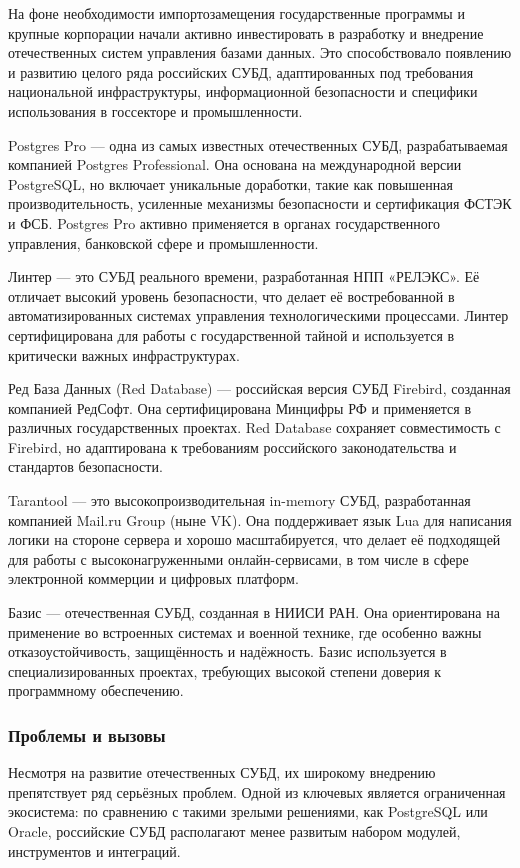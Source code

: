На фоне необходимости импортозамещения государственные программы и крупные корпорации начали активно инвестировать в разработку и внедрение отечественных систем управления базами данных. Это способствовало появлению и развитию целого ряда российских СУБД, адаптированных под требования национальной инфраструктуры, информационной безопасности и специфики использования в госсекторе и промышленности.

Postgres Pro — одна из самых известных отечественных СУБД, разрабатываемая компанией Postgres Professional. Она основана на международной версии PostgreSQL, но включает уникальные доработки, такие как повышенная производительность, усиленные механизмы безопасности и сертификация ФСТЭК и ФСБ. Postgres Pro активно применяется в органах государственного управления, банковской сфере и промышленности.

Линтер — это СУБД реального времени, разработанная НПП «РЕЛЭКС». Её отличает высокий уровень безопасности, что делает её востребованной в автоматизированных системах управления технологическими процессами. Линтер сертифицирована для работы с государственной тайной и используется в критически важных инфраструктурах.

Ред База Данных (Red Database) — российская версия СУБД Firebird, созданная компанией РедСофт. Она сертифицирована Минцифры РФ и применяется в различных государственных проектах. Red Database сохраняет совместимость с Firebird, но адаптирована к требованиям российского законодательства и стандартов безопасности.

Tarantool — это высокопроизводительная in-memory СУБД, разработанная компанией Mail.ru Group (ныне VK). Она поддерживает язык Lua для написания логики на стороне сервера и хорошо масштабируется, что делает её подходящей для работы с высоконагруженными онлайн-сервисами, в том числе в сфере электронной коммерции и цифровых платформ.

Базис — отечественная СУБД, созданная в НИИСИ РАН. Она ориентирована на применение во встроенных системах и военной технике, где особенно важны отказоустойчивость, защищённость и надёжность. Базис используется в специализированных проектах, требующих высокой степени доверия к программному обеспечению.

\subsubsection{Проблемы и вызовы}

Несмотря на развитие отечественных СУБД, их широкому внедрению препятствует ряд серьёзных проблем. Одной из ключевых является ограниченная экосистема: по сравнению с такими зрелыми решениями, как PostgreSQL или Oracle, российские СУБД располагают менее развитым набором модулей, инструментов и интеграций.

